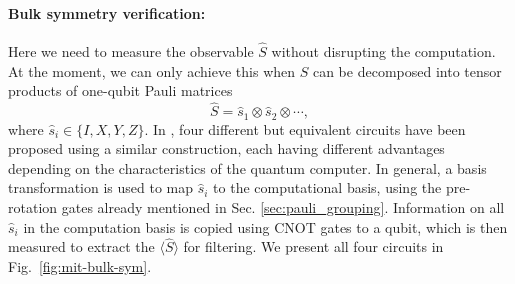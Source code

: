 \paragraph{Bulk symmetry verification:}
Here we need to measure the observable $\hat{S}$ without disrupting the computation. At the moment, we can only achieve this when $\hat{S}$ can be decomposed into tensor products of one-qubit Pauli matrices
\begin{equation}
    \hat{S} = \hat{s}_1 \otimes \hat{s}_2 \otimes \cdots,
\end{equation}
where $\hat{s}_i\in \{I, X, Y, Z\}$. In \citet{bonet-monroigLowcostErrorMitigation2018}, four different but equivalent circuits have been proposed using a similar construction, each having different advantages depending on the characteristics of the quantum computer. In general, a basis transformation is used to map $\hat{s}_i$ to the computational basis, using the pre-rotation gates already mentioned in Sec. \ref{sec:pauli_grouping}. Information on all $\hat{s}_i$ in the computation basis is copied using CNOT gates to a qubit, which is then measured to extract the $\langle \hat{S}\rangle$ for filtering. We present all four circuits in Fig.~\ref{fig:mit-bulk-sym}.

